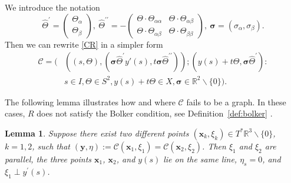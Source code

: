 \documentclass[11pt]{article}
\newcommand{\be}{\begin{equation}}
\newcommand{\ee}{\end{equation}}
\newcommand{\cC}{\mathcal C}
\newcommand{\br}{\mathbb{R}}
\newcommand{\bt}{\beta}
\newcommand{\al}{\alpha}
\numberwithin{equation}{section}
\newcommand{\vy}{\mathbf{y}}
\newcommand{\vx}{\mathbf{x}}
\newcommand{\Cc}{\mathcal{C}}
\newcommand{\vsig}{{\boldsymbol{\sigma}}}
\newtheorem{lemma}[theorem]{Lemma}
\theoremstyle{definition}
\begin{document}
\noindent We introduce the notation
\be\label{useful matr}
\hat\Theta^\prime= \begin{pmatrix}\Theta_\al \\  \Theta_\bt\end{pmatrix},\
\hat\Theta^{\prime\prime}
=-\begin{pmatrix} \Theta\cdot\Theta_{\al\al} & \Theta\cdot\Theta_{\al\bt}\\
\Theta\cdot\Theta_{\al\bt} & \Theta\cdot\Theta_{\bt\bt}
\end{pmatrix},\ \vsig=(\sigma_\al,\sigma_\bt).
\ee 
Then we can rewrite \eqref{CR} in a simpler form
\be\label{CR alt}
\begin{split}
\cC
 = \Big(&((s,\Theta), ( \vsig\hat\Theta^\prime y'(s), t\vsig\hat \Theta^{\prime\prime}));(y(s)+t\Theta, \vsig\hat\Theta^\prime ):\\
&  s\in I,\Theta\in S^2,y(s)+t\Theta\in X,\vsig\in \br^2\backslash \{0\}\Big).
\end{split}
\ee

The following lemma illustrates how and where $\Cc$ fails to be a graph. In these cases, $R$ does not satisfy the Bolker condition, see Definition~\ref{def:bolker} \cite[Section 8]{flu}.

\begin{lemma}\label{lem:bolk fail} Suppose there exist two different points $(\vx_k,\xi_k)\in T^*\br^3\backslash \{0\}$, $k=1,2$, such that $(\vy,\eta):=\Cc(\vx_1,\xi_1)=\Cc(\vx_2,\xi_2)$. Then $\xi_1$ and $\xi_2$ are parallel, the three points $\vx_1$, $\vx_2$, and $y(s)$ lie on the same line, $\eta_s=0$, and $\xi_1\perp y^\prime(s)$.
\end{lemma}
\end{document}
